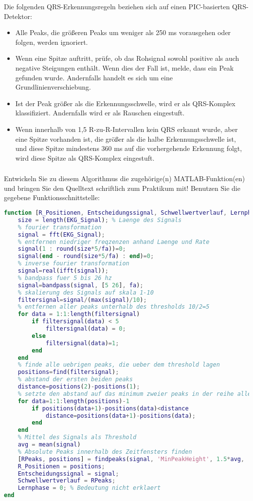 \documentclass[a4paper,12pt,titlepage]{scrartcl}
\begin{document}
Die folgenden QRS-Erkennungsregeln beziehen sich auf einen PIC-basierten QRS-Detektor:
\begin{itemize}
    \item Alle Peaks, die größeren Peaks um weniger als 250 ms vorausgehen oder folgen, werden ignoriert.
    \item Wenn eine Spitze auftritt, prüfe, ob das Rohsignal sowohl positive als auch negative Steigungen enthält. Wenn dies der Fall ist, melde, dass ein Peak gefunden wurde. Andernfalls handelt es sich um eine Grundlinienverschiebung.
    \item Ist der Peak größer als die Erkennungsschwelle, wird er als QRS-Komplex klassifiziert. Andernfalls wird er als Rauschen eingestuft.
    \item Wenn innerhalb von 1,5 R-zu-R-Intervallen kein QRS erkannt wurde, aber eine Spitze vorhanden ist, die größer als die halbe Erkennungsschwelle ist, und diese Spitze mindestens 360 ms auf die vorhergehende Erkennung folgt, wird diese Spitze als QRS-Komplex eingestuft.
\end{itemize}

\subsubsection{}
Entwickeln Sie zu diesem Algorithmus die zugehörige(n) MATLAB-Funktion(en) und bringen Sie den Quelltext schriftlich zum Praktikum mit! Benutzen Sie die gegebene Funktionsschnittstelle:
\begin{lstlisting}[basicstyle=\tiny, language=matlab]
function [R_Positionen, Entscheidungssignal, Schwellwertverlauf, Lernphase] = QRS_Detektion (EKG_Signal, fa);
    size = length(EKG_Signal); % Laenge des Signals
    % fourier transformation
    signal = fft(EKG_Signal);
    % entfernen niedriger freqzenzen anhand Laenge und Rate
    signal(1 : round(size*5/fa))=0;
    signal(end - round(size*5/fa) : end)=0;
    % inverse fourier transformation
    signal=real(ifft(signal));
    % bandpass fuer 5 bis 26 hz
    signal=bandpass(signal, [5 26], fa);
    % skalierung des Signals auf skala 1-10
    filtersignal=signal/(max(signal)/10);
    % entfernen aller peaks unterhalb des thresholds 10/2=5
    for data = 1:1:length(filtersignal)
        if filtersignal(data) < 5
            filtersignal(data) = 0;
        else
            filtersignal(data)=1;
        end
    end
    % finde alle uebrigen peaks, die ueber dem threshold lagen
    positions=find(filtersignal);
    % abstand der ersten beiden peaks
    distance=positions(2)-positions(1);
    % setzte den abstand auf das minimum zweier peaks in der reihe aller uebrigen peaks
    for data=1:1:length(positions)-1
        if positions(data+1)-positions(data)<distance
            distance=positions(data+1)-positions(data);
        end
    end
    % Mittel des Signals als Threshold
    avg = mean(signal) 
    % Absolute Peaks innerhalb des Zeitfensters finden
    [RPeaks, positions] = findpeaks(signal, 'MinPeakHeight', 1.5*avg, 'MinPeakDistance', distance, "MaxPeakWidth", 250);
    R_Positionen = positions;
    Entscheidungssignal = signal;
    Schwellwertverlauf = RPeaks;
    Lernphase = 0; % Bedeutung nicht erklaert
end
\end{lstlisting}
\end{document}
